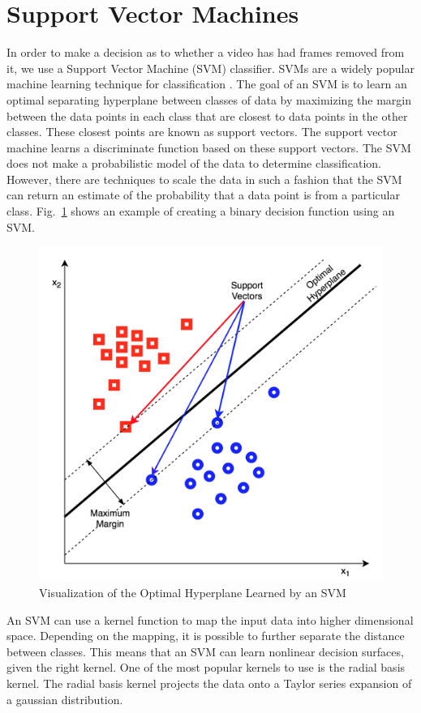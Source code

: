 \section{Support Vector Machines}

In order to make a decision as to whether a video has had frames removed from it, we use a Support Vector Machine (SVM) classifier. SVMs are a widely popular machine learning technique for classification \cite{svm}. The goal of an SVM is to learn an optimal separating hyperplane between classes of data by maximizing the margin between the data points in each class that are closest to data points in the other classes. These closest points are known as support vectors. The support vector machine learns a discriminate function based on these support vectors. The SVM does not make a probabilistic model of the data to determine classification. However, there are techniques \cite{plattscaling} to scale the data in such a fashion that the SVM can return an estimate of the probability that a data point is from a particular class. Fig.~\ref{svmvis} shows an example of creating a binary decision function  using an SVM.

\begin{figure}[htbp]
\centerline{\includegraphics[width=0.7\linewidth]{Background/svm_vis.png}}
\caption{Visualization of the Optimal Hyperplane Learned by an SVM }
\label{svmvis}
\end{figure}

An SVM can use a kernel function to map the input data into higher dimensional space. Depending on the mapping, it is possible to further separate the distance between classes. This means that an SVM can learn nonlinear decision surfaces, given the right kernel. One of the most popular kernels to use is the radial basis kernel. The radial basis kernel projects the data onto a Taylor series expansion of a gaussian distribution.
